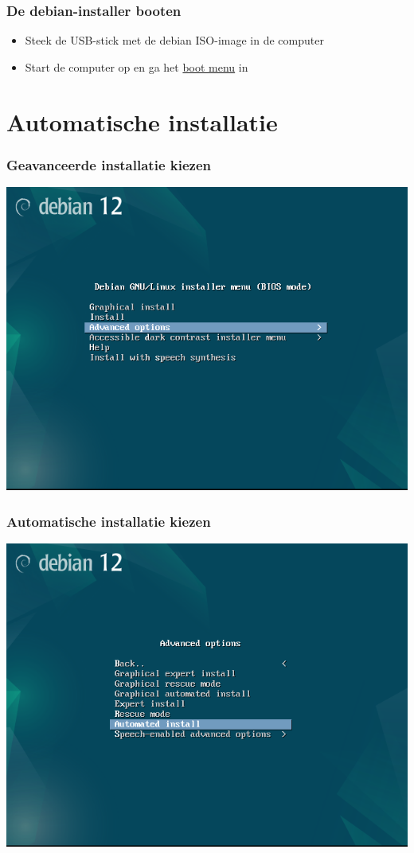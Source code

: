 \documentclass{beamer}
\begin{document}
\begin{frame}
  \frametitle{De \textbf{debian-installer} booten}
  \begin{itemize}
    \item Steek de USB-stick met de debian ISO-image in de computer
    \item Start de computer op en ga het \href{https://www.boot-disk.com/quest_bootmenu.htm}{boot menu} in
  \end{itemize}

\end{frame}


\section{Automatische installatie}

\begin{frame}
  \frametitle{Geavanceerde installatie kiezen}

  \centering
  \includegraphics[width=\textwidth]{img/advanced-options.png}
\end{frame}

\begin{frame}
  \frametitle{Automatische installatie kiezen}

  \centering
  \includegraphics[width=\textwidth]{img/automated-install.png}
\end{frame}

\end{document}
